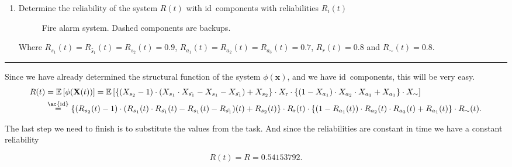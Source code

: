 \pagebreak

\begin{enumerate}[label = \alph*)]
    \item Determine the reliability of the system \(R(t)\) with \ac{id}~components with reliabilities \(R_i(t)\)

\begin{figure}[H]
    \centering
    \label{fig:diagram1}
    \caption{Fire alarm system. Dashed components are backups.}
\end{figure}

Where \(R_{s_1}(t) = R_{\tilde{s_1}}(t) = R_{s_2}(t) = 0.9\), \(R_{a_1}(t) = R_{a_2}(t) = R_{a_3}(t) = 0.7\), \(R_{r}(t)
= 0.8\) and \(R_\sim(t) = 0.8\).

\end{enumerate}

%         

\hrule
\medskip

Since we have already determined the structural function of the system \(\phi(\mathbf{x})\), and we have
\ac{id}~components, this will be very easy.
\[
    \begin{split}
        R(t) &= \mathbb{E}\left[\phi(\mathbf{X}(t)) \right] = \mathbb{E}\left[\left\{ (X_{s_2} - 1) \cdot (X_{s_1}\cdot
    X_{\tilde{s_1}} - X_{s_1} - X_{\tilde{s_1}}) + X_{s_2} \right\} \cdot X_\text{r} \cdot \left\{ (1 - X_{a_1}) \cdot
X_{a_2}\cdot X_{a_3} + X_{a_1} \right\} \cdot X_{\sim}  \right] \\
             &\overset{\text{\ac{id}}}{=} \left\{ (R_{s_2}(t) - 1) \cdot (R_{s_1}(t)\cdot
    R_{\tilde{s_1}}(t) - R_{s_1}(t) - R_{\tilde{s_1}})(t) + R_{s_2}(t) \right\} \cdot R_\text{r}(t) \cdot \left\{ (1
    - R_{a_1}(t)) \cdot
R_{a_2}(t)\cdot R_{a_3}(t) + R_{a_1}(t) \right\} \cdot R_{\sim}(t).
    \end{split}
\] 

The last step we need to finish is to substitute the values from the task. And since the reliabilities are constant in
time we have a constant reliability

\begin{equation*}
      R(t) = R = 0.54153792.
\end{equation*}
    
